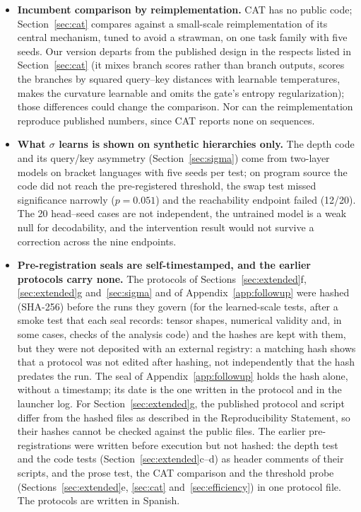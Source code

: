 \documentclass[11pt]{article}
\begin{document}
\begin{itemize}
\item \textbf{Incumbent comparison by reimplementation.} CAT has no public code; Section~\ref{sec:cat} compares against a small-scale reimplementation of its central mechanism, tuned to avoid a strawman, on one task family with five seeds. Our version departs from the published design in the respects listed in Section~\ref{sec:cat} (it mixes branch scores rather than branch outputs, scores the branches by squared query--key distances with learnable temperatures, makes the curvature learnable and omits the gate's entropy regularization); those differences could change the comparison. Nor can the reimplementation reproduce published numbers, since CAT reports none on sequences.
\item \textbf{What $\sigma$ learns is shown on synthetic hierarchies only.} The depth code and its query/key asymmetry (Section~\ref{sec:sigma}) come from two-layer models on bracket languages with five seeds per test; on program source the code did not reach the pre-registered threshold, the swap test missed significance narrowly ($p = 0.051$) and the reachability endpoint failed (12/20). The 20 head--seed cases are not independent, the untrained model is a weak null for decodability, and the intervention result would not survive a correction across the nine endpoints.
\item \textbf{Pre-registration seals are self-timestamped, and the earlier protocols carry none.} The protocols of Sections~\ref{sec:extended}f, \ref{sec:extended}g and~\ref{sec:sigma} and of Appendix~\ref{app:followup} were hashed (SHA-256) before the runs they govern (for the learned-scale tests, after a smoke test that each seal records: tensor shapes, numerical validity and, in some cases, checks of the analysis code) and the hashes are kept with them, but they were not deposited with an external registry: a matching hash shows that a protocol was not edited after hashing, not independently that the hash predates the run. The seal of Appendix~\ref{app:followup} holds the hash alone, without a timestamp; its date is the one written in the protocol and in the launcher log. For Section~\ref{sec:extended}g, the published protocol and script differ from the hashed files as described in the Reproducibility Statement, so their hashes cannot be checked against the public files. The earlier pre-registrations were written before execution but not hashed: the depth test and the code tests (Section~\ref{sec:extended}c--d) as header comments of their scripts, and the prose test, the CAT comparison and the threshold probe (Sections~\ref{sec:extended}e, \ref{sec:cat} and~\ref{sec:efficiency}) in one protocol file. The protocols are written in Spanish.

\end{itemize}
\end{document}
